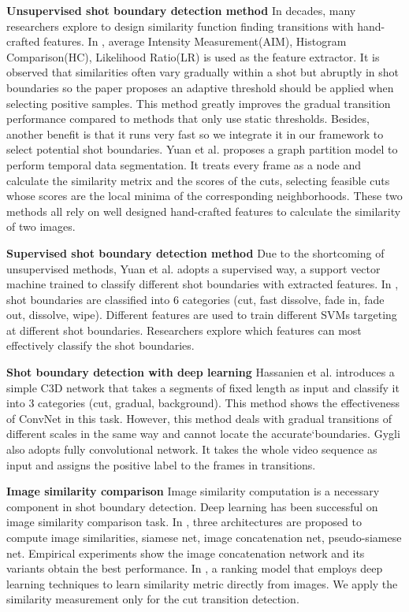 \documentclass[runningheads]{llncs}
\begin{document}
\textbf{Unsupervised shot boundary detection method} In decades, many researchers explore to design similarity function finding transitions with hand-crafted features. In \cite{yusoff2000video}, average Intensity Measurement(AIM), Histogram Comparison(HC), Likelihood Ratio(LR) is used as the feature extractor. It is observed that similarities often vary gradually within a shot but abruptly in shot boundaries so the paper proposes an adaptive threshold should be applied when selecting positive samples. This method greatly improves the gradual transition performance compared to methods that only use static thresholds. Besides, another benefit is that it runs very fast so we integrate it in our framework to select potential shot boundaries. Yuan et al.\cite{yuan2005unified} proposes a graph partition model to perform temporal data segmentation. It treats every frame as a node and calculate the similarity metrix and the scores of the cuts, selecting feasible cuts whose scores are the local minima of the corresponding neighborhoods. These two methods all rely on well designed hand-crafted features to calculate the similarity of two images. 

\textbf{Supervised shot boundary detection method} Due to the shortcoming of unsupervised methods, Yuan et al.\cite{yuan2007formal} adopts a supervised way, a support vector machine trained to classify different shot boundaries with extracted features. In \cite{liu2007t}, shot boundaries are classified into 6 categories (cut, fast dissolve, fade in, fade out, dissolve, wipe). Different features are used to train different SVMs targeting at different shot boundaries. Researchers explore which features can most effectively classify the shot boundaries.

\textbf{Shot boundary detection with deep learning} Hassanien et al.\cite{hassanien2017large} introduces a simple C3D network that takes a segments of fixed length as input and classify it into 3 categories (cut, gradual, background). This method shows the effectiveness of ConvNet in this task. However, this method deals with gradual transitions of different scales in the same way and cannot locate the accurate`boundaries. Gygli\cite{gygli2017ridiculously} also adopts fully convolutional network. It takes the whole video sequence as input and assigns the positive label to the frames in transitions.

\textbf{Image similarity comparison} Image similarity computation is a necessary component in shot boundary detection. Deep learning has been successful on image similarity comparison task. In \cite{zagoruyko2015learning}, three architectures are proposed to compute image similarities, siamese net, image concatenation net, pseudo-siamese net. Empirical experiments show the image concatenation network and its variants obtain the best performance. In \cite{wang2014learning}, a ranking model that employs deep learning techniques to learn similarity metric directly from images. We apply the similarity measurement only for the cut transition detection.
\end{document}
